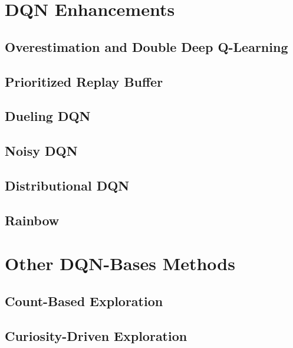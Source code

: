 	\section{DQN Enhancements} %

		\subsection{Overestimation and Double Deep Q-Learning} %

		\subsection{Prioritized Replay Buffer} %

		\subsection{Dueling DQN} %

		\subsection{Noisy DQN} %

		\subsection{Distributional DQN} %

		\subsection{Rainbow} %

	\section{Other DQN-Bases Methods} %

		\subsection{Count-Based Exploration} %

		\subsection{Curiosity-Driven Exploration} %

